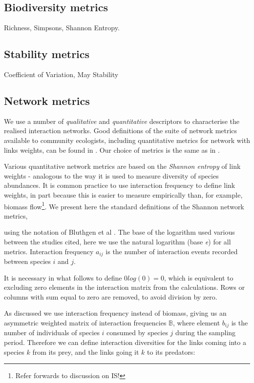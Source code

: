 \subsection{Biodiversity metrics}
\label{sec:define_dviersity}
Richness, Simpsons, Shannon Entropy.

\subsection{Stability metrics}
\label{sec:def_stability_metrics}

Coefficient of Variation, May Stability

\subsection{Network metrics}
\label{sec:define_network_metrics}

We use a number of \emph{qualitative} and \emph{quantitative} descriptors to characterise the realised interaction networks. Good definitions of the suite of network metrics available to community ecologists, including quantitative metrics for network with links weights, can be found in \cite{}. Our choice of metrics is the same as in \cite{lurgi2015effects}.


Various quantitative network metrics are based on the \emph{Shannon entropy} of link weights - analogous to the way it is used to measure diversity of species abundances. It is common practice to use interaction frequency to define link weights, in part because this is easier to measure empirically than, for example, biomass flow\footnote{Refer forwards to discussion on IS!}. We present here the standard definitions of the Shannon network metrics, 



using the notation of Bluthgen et al \cite{bluthgen2008interaction}. The base of the logarithm used various between the studies cited, here we use the natural logarithm (base \emph{e}) for all metrics. 
 Interaction frequency $a_{ij}$ is the number of interaction events recorded between species $i$ and $j$. 

It is necessary in what follows to define $0log(0)=0$, which is equivalent to excluding zero elements in the interaction matrix from the calculations. Rows or columns with sum equal to zero are removed, to avoid division by zero.    
 
As discussed we use interaction frequency instead of biomass, giving us an asymmetric weighted matrix of interaction frequencies $\mathbb{B}$, where element $b_{ij}$ is the number of individuals of species $i$ consumed by species $j$ during the sampling period. Therefore we can define interaction diversities for the links coming into a species $k$ from its prey, and the links going it $k$ to its predators:  

